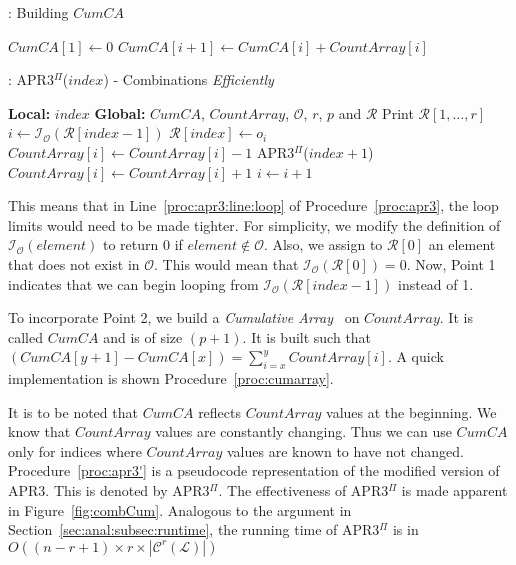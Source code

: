 \documentclass{article}
\begin{document}
\begin{algorithm}
\begin{algorithmic}[1]
\caption{: Building $CumCA$}
\label{proc:cumarray}
\STATE $CumCA[1] \gets 0$
	\STATE $CumCA[i+1] \gets CumCA[i] + CountArray[i]$
\ENDFOR
\end{algorithmic}
\end{algorithm}

\begin{algorithm}
\begin{algorithmic}[1]
\caption{: APR3$^{\Pi}$($index$) - Combinations \emph{Efficiently}}
\label{proc:apr3'}
\STATE \textbf{Local:} $index$
\STATE \textbf{Global:} $CumCA$, $CountArray$, $\mathcal{O}$, $r$, $p$ and $\mathcal{R}$
\medskip
{}
	\STATE Print $\mathcal{R}[1, \ldots, r]$
	\RETURN
\ELSE
	\STATE $i \gets \mathcal{I}_{\mathcal{O}}(\mathcal{R}[index-1])$
			\STATE $\mathcal{R}[index] \gets o_i$ 
			\STATE $CountArray[i] \gets CountArray[i] - 1$
			\STATE APR3$^{\Pi}$($index + 1$)
			\STATE $CountArray[i] \gets CountArray[i] + 1$
		\ENDIF
		\STATE $i \gets i + 1$
	\ENDWHILE
\ENDIF
\end{algorithmic}
\end{algorithm}

This means that in Line~\ref{proc:apr3:line:loop} of Procedure~\ref{proc:apr3}, the loop limits would need to be made tighter. For simplicity, we modify the definition of $\mathcal{I}_{\mathcal{O}}(element)$ to return 0 if $element \notin \mathcal{O}$. Also, we assign to $\mathcal{R}[0]$ an element that does not exist in $\mathcal{O}$. This would mean that $\mathcal{I}_{\mathcal{O}}(\mathcal{R}[0]) = 0$. Now, Point 1 indicates that we can begin looping from $\mathcal{I}_{\mathcal{O}}(\mathcal{R}[index-1])$ instead of 1.

To incorporate Point 2, we build a \emph{Cumulative Array}~\cite{pearls} on $CountArray$. It is called $CumCA$ and is of size $(p+1)$. It is built such that $(CumCA[y+1] - CumCA[x]) = \sum_{i=x}^y CountArray[i]$. A quick implementation is shown Procedure~\ref{proc:cumarray}.

It is to be noted that $CumCA$ reflects $CountArray$ values at the beginning. We know that $CountArray$ values are constantly changing. Thus we can use $CumCA$ only for indices where $CountArray$ values are known to have not changed. Procedure~\ref{proc:apr3'} is a pseudocode representation of the modified version of APR3. This is denoted by APR3$^{\Pi}$. The effectiveness of APR3$^{\Pi}$ is made apparent in Figure~\ref{fig:combCum}. Analogous to the argument in Section~\ref{sec:anal:subsec:runtime}, the running time of APR3$^{\Pi}$ is in $O((n-r+1) \times r \times |\mathcal{C}^{r}(\mathcal{L})|)$
\end{document}
